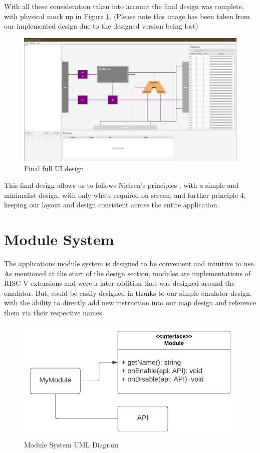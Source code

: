 With all these consideration taken into account the final design was complete, with physical mock up in Figure \ref{fig:final_implemented_design}. (Please note this image has been taken from our implemented design due to the designed version being lost)

\begin{figure}[H]
    \centering
    \includegraphics[width=0.9\linewidth]{dissertation/DATA/final_design.jpg}
    \caption{Final full UI design}
    \label{fig:final_implemented_design}
\end{figure}

This final design allows us to follows Nielsen's principles \cite{nielsen_2020_10}, with a simple and minimalist design, with only whats required on screen, and further principle 4, keeping our layout and design consistent across the entire application.





\section{Module System}\label{sec:module}
The applications module system is designed to be convenient and intuitive to use. As mentioned at the start of the design section, modules are implementations of RISC-V extensions and were a later addition that was designed around the emulator. But, could be easily designed in thanks to our simple emulator design, with the ability to directly add new instruction into our map design and reference them via their respective names.

\begin{figure}[H]
    \centering
    \includegraphics[width=0.9\linewidth]{dissertation/DATA/module uml.png}
    \caption{Module System UML Diagram}
    \label{fig:module_uml}
\end{figure}

